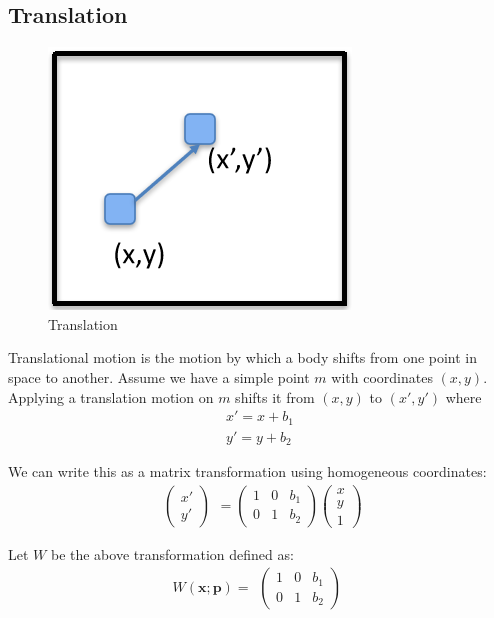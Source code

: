 \documentclass{article}
\begin{document}
\subsection{Translation}
\begin{figure}[h]
  \centering
  \includegraphics{translation.png}
  \caption{Translation}
\end{figure}
Translational motion is the motion by which a body shifts from one point in space to another.
Assume we have a simple point $m$ with coordinates $(x,y)$.
Applying a translation motion on $m$ shifts it from $(x,y)$ to $(x',y')$ where 
\begin{equation}
  \begin{aligned}
    x' = x + b_1 \\
    y' = y + b_2
  \end{aligned}
\end{equation}

We	can	write	this	as	a	matrix	transformation	using	homogeneous	coordinates: 
\begin{equation}
  \begin{matrix}\begin{pmatrix}x' \\ y' \end{pmatrix}\end{matrix}=
  \begin{pmatrix} 1 & 0 & b_1 \\ 0 & 1 & b_2 \end{pmatrix} 
  \begin{pmatrix} x \\ y \\ 1 \end{pmatrix}
\end{equation}

Let $W$ be the above transformation defined as:
\begin{equation}
	W(\bm{x};\bm{p}) = \begin{matrix}\begin{pmatrix} 1 & 0 & b_1 \\ 0 & 1 & b_2 \end{pmatrix}\end{matrix}
\end{equation}
\end{document}
